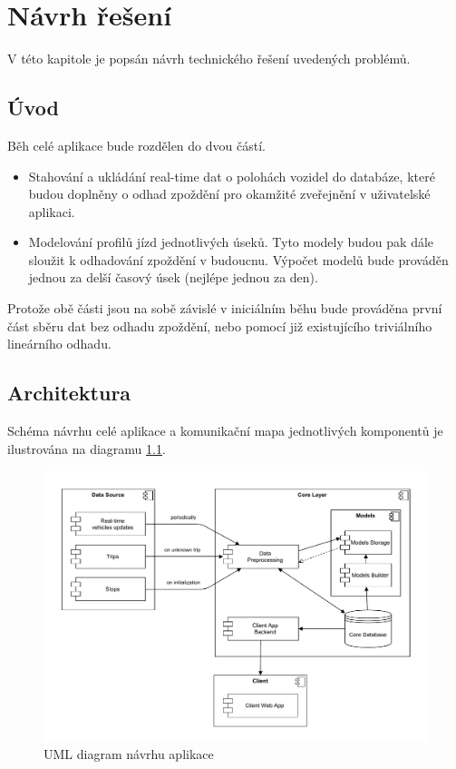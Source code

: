 

\chapter{Návrh řešení}


V této kapitole je popsán návrh technického řešení uvedených problémů.


\section{Úvod}


Běh celé aplikace bude rozdělen do dvou částí.


\begin{itemize}
\item Stahování a ukládání real-time dat o polohách vozidel do databáze, které budou doplněny o odhad zpoždění pro okamžité zveřejnění v uživatelské aplikaci.


\item Modelování profilů jízd jednotlivých úseků. Tyto modely budou pak dále sloužit k odhadování zpoždění v budoucnu. Výpočet modelů bude prováděn jednou za delší časový úsek (nejlépe jednou za den).
\end{itemize}


Protože obě části jsou na sobě závislé v iniciálním běhu bude prováděna první část sběru dat bez odhadu zpoždění, nebo pomocí již existujícího triviálního lineárního odhadu.

\section{Architektura}


Schéma návrhu celé aplikace a komunikační mapa jednotlivých komponentů je ilustrována na diagramu \ref{fig:design_diagram}.


\begin{figure}
\centering
  \includegraphics[width=\linewidth]{../img/design_diagram}
  \caption{UML diagram návrhu aplikace}
  \label{fig:design_diagram}
\end{figure}


